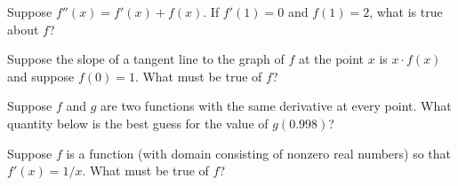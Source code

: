 \documentclass{ximera}
\newcommand{\recommendation}[1]{}
\begin{document}
\begin{shuffle}


\begin{problem}
  Suppose $f''(x) = f'(x) + f(x)$.  If $f'(1) = 0$ and $f(1) = 2$, what is true about $f$?
  \begin{multipleChoice}
  \end{multipleChoice}
\end{problem}

\begin{problem}
  Suppose the slope of a tangent line to the graph of $f$ at the point $x$ is $x \cdot f(x)$ and suppose $f(0) = 1$.  What must be true of $f$?
  \begin{multipleChoice}
  \end{multipleChoice}
\end{problem}



\begin{problem}
  Suppose $f$ and $g$ are two functions with the same derivative at every point.  What quantity below is the best guess for the value of $g(0.998)$?
  \begin{multipleChoice}
  \end{multipleChoice}
\end{problem}

\begin{problem}
  Suppose $f$ is a function (with domain consisting of nonzero real numbers) so that $f'(x) = 1/x$.  What must be true of $f$?
  \begin{multipleChoice}
  \end{multipleChoice}
\end{problem}


\end{shuffle}
\end{document}
